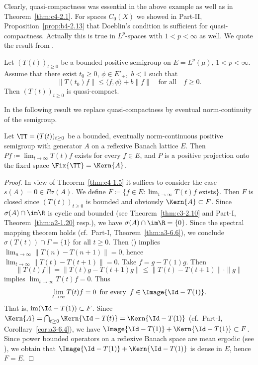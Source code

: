 Clearly, quasi-compactness was essential in the above example as well as in Theorem~\ref{thm:c4-2.1}.
For spaces $C_{0}(X)$ we showed in 
Part-II, Proposition~\ref{prop:b4-2.13} 
that Doeblin's condition is sufficient for quasi-compactness.
Actually this is true in $L^{p}$-spaces with $1 < p < \infty$ as well.
We quote the result from \textcite{lotz:1986}.
\begin{proposition}\label{prop:c4-2.4}
%
%
Let $(T(t))_{t \geq 0}$ be a bounded positive semigroup on $E = L^{p}(\mu)$, $1 < p < \infty$.
Assume that there exist $t_{0} \geq 0$, $\phi \in E'_{+}$,\, $b < 1$ such that
\begin{equation}\label{eq:c4-2.4}
\|T(t_{0})f\| \leq \langle f,\phi \rangle + b\|f\| \quad \text{for all} \quad f \geq 0.
\end{equation}
Then $(T(t))_{t \geq 0}$ is quasi-compact.
\end{proposition}
In the following result we replace quasi-compactness by eventual norm-continuity of the semigroup.
\begin{theorem} \label{thm:c4-2.5}
%
Let $\TT = (T(t))_{t \geq 0}$ be a bounded, eventually norm-continuous positive semigroup with generator $A$ on a reflexive Banach lattice $E$.
Then $Pf \coloneqq  \lim_{t \to \infty} T(t)f$ exists for every $f \in E$, and
$P$ is a positive projection onto the fixed space $\Fix{\TT} = \Kern{A}$. 
\end{theorem}
\begin{proof}
In view of Theorem~\ref{thm:c4-1.5} it suffices to consider the case $s(A) = 0 \in P{\sigma}(A)$.
We define $F \coloneqq \{f \in E \colon \lim_{t \to \infty} T(t)f \text{ exists}\}$.
Then $F$ is closed since $(T(t))_{t \geq 0}$ is bounded and obviously $\Kern{A} \subset F$.
Since $\sigma(A) \cap \im\R$ is cyclic and bounded (see Theorem~\ref{thm:c3-2.10} and Part-I, Theorem~\ref{thm:a2-1.20} resp.), we have $\sigma(A) \cap \im\R = \{0\}$.
Since the spectral mapping theorem holds (cf.\ Part-I, Theorem~\ref{thm:a3-6.6}), we conclude $\sigma(T(t)) \cap \Gamma = \{1\}$ for all $t \geq 0$.
Then () implies $\lim_{n \to \infty} \|T(n) - T(n+1)\| = 0$, hence $\lim_{t \to \infty}\|T(t) - T(t+1)\| = 0$.
Take $f = g - T(1)g$.
Then 
%
\[
	\|T(t)f\| = \|T(t)g - T(t+1)g\| \leq \|T(t) - T(t+1)\| \cdot \|g\|
\]
%
implies $\lim_{t \to \infty} T(t)f = 0$.
Thus
\begin{equation}\label{eq:c4-2.5}
\lim_{t \to \infty} T(t)f = 0\, \text{ for every }\, f \in \Image{\Id - T(1)}.
\end{equation}
That is, $\mathrm{im}(\Id - T(1)) \subset F$.
Since $\Kern{A} = \bigcap_{t \geq 0} \Kern{\Id - T(t)} = \Kern{\Id - T(1)}$ (cf.\ Part-I, Corollary~\ref{cor:a3-6.4}), we have $\Image{\Id - T(1)} + \Kern{\Id - T(1)} \subset F$.
Since power bounded operators on a reflexive Banach space are mean ergodic (\eg  see \textcite[Chapter~2, Theorem~1.2]{krengel:1985}), we obtain that $\Image{\Id - T(1)} + \Kern{\Id - T(1)}$ is dense in $E$, hence $F = E$.
\end{proof}
